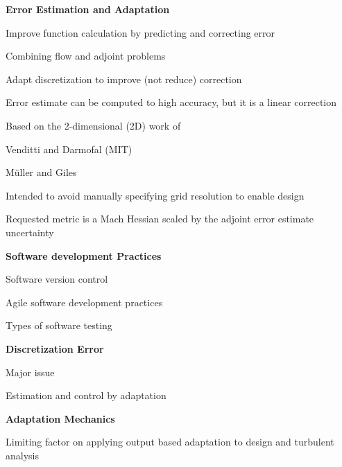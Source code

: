 \documentclass[landscape]{slides}
\renewcommand{\title}[1]{{\large\bfseries #1}}
\newenvironment{itemiz}%
  {\begin{list}{}{\raggedright
      \setlength{\itemsep}{2pt}%
      \setlength{\parskip}{4pt}\setlength{\parsep}{2pt}}}%
  {\end{list}}%
\begin{document}
 \begin{slide}
   \title{Error Estimation and Adaptation}
   \begin{itemiz}
   \item Improve function calculation by predicting and correcting error
   \item Combining flow and adjoint problems
   \item Adapt discretization to improve (not reduce) correction
     \begin{itemiz}
     \item Error estimate can be computed to high accuracy, but it is
       a linear correction
     \end{itemiz}
   \item Based on the 2-dimensional (2D) work of 
     \begin{itemiz}
     \item Venditti and Darmofal (MIT)
     \item M\"uller and Giles
     \end{itemiz}
   \item Intended to avoid manually specifying grid resolution
     to enable design
   \item Requested metric is a Mach Hessian scaled by the adjoint
   error estimate uncertainty
   \end{itemiz}
 \end{slide}

 \begin{slide}
   \title{ Software development Practices }
   \begin{itemiz}
   \item Software version control
   \item Agile software development practices
   \item Types of software testing
   \end{itemiz}
   \title{ Discretization Error }
   \begin{itemiz}
   \item Major issue
   \item Estimation and control by adaptation
   \end{itemiz}
   \title{ Adaptation Mechanics }
   \begin{itemiz}
   \item Limiting factor on applying output based adaptation to design
   and turbulent analysis
   \end{itemiz}
 \end{slide}
 
\end{document}
